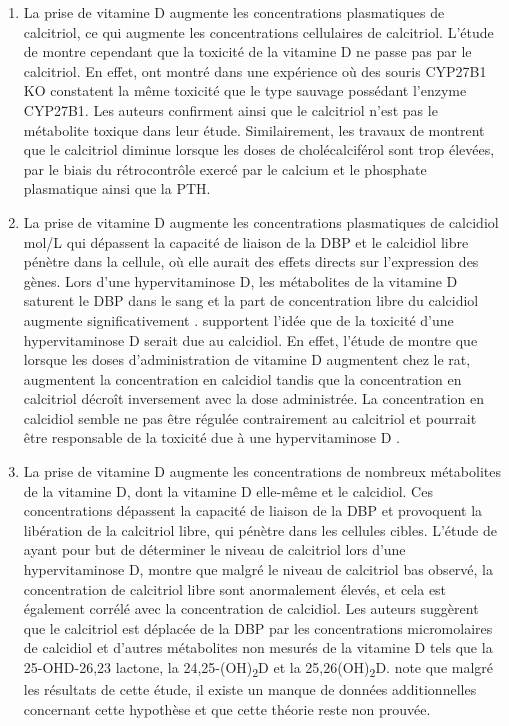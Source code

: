 \documentclass[
  a4paper,
  DIV=11,
  numbers=noendperiod,
  listof=totoc]{scrreprt}
\begin{document}
\begin{enumerate}
\def\labelenumi{\arabic{enumi}.}
\item
  La prise de vitamine D augmente les concentrations plasmatiques de
  calcitriol, ce qui augmente les concentrations cellulaires de
  calcitriol. L'étude de \textcite{DeLuca.2011} montre cependant que la
  toxicité de la vitamine D ne passe pas par le calcitriol. En effet,
  \textcite{DeLuca.2011} ont montré dans une expérience où des souris
  \ac{CYP27B1} KO constatent la même toxicité que le type sauvage
  possédant l'enzyme \ac{CYP27B1}. Les auteurs confirment ainsi que le
  calcitriol n'est pas le métabolite toxique dans leur étude.
  Similairement, les travaux de \textcite{Shepard.1980} montrent que le
  calcitriol diminue lorsque les doses de cholécalciférol sont trop
  élevées, par le biais du rétrocontrôle exercé par le calcium et le
  phosphate plasmatique ainsi que la \ac{PTH}.
\item
  La prise de vitamine D augmente les concentrations plasmatiques de
  calcidiol mol/L qui dépassent la capacité de liaison de la \ac{DBP} et
  le calcidiol libre pénètre dans la cellule, où elle aurait des effets
  directs sur l'expression des gènes. Lors d'une hypervitaminose D, les
  métabolites de la vitamine D saturent le DBP dans le sang et la part
  de concentration libre du calcidiol augmente significativement
  \autocite{Jones.2008}. \textcite{DeLuca.2011} supportent l'idée que de
  la toxicité d'une hypervitaminose D serait due au calcidiol. En effet,
  l'étude de \textcite{Shepard.1980} montre que lorsque les doses
  d'administration de vitamine D augmentent chez le rat, augmentent la
  concentration en calcidiol tandis que la concentration en calcitriol
  décroît inversement avec la dose administrée. La concentration en
  calcidiol semble ne pas être régulée contrairement au calcitriol et
  pourrait être responsable de la toxicité due à une hypervitaminose D
  \autocite{DeLuca.2011,Shepard.1980}.
\item
  La prise de vitamine D augmente les concentrations de nombreux
  métabolites de la vitamine D, dont la vitamine D elle-même et le
  calcidiol. Ces concentrations dépassent la capacité de liaison de la
  DBP et provoquent la libération de la calcitriol libre, qui pénètre
  dans les cellules cibles. L'étude de \textcite{Pettifor.1995} ayant
  pour but de déterminer le niveau de calcitriol lors d'une
  hypervitaminose D, montre que malgré le niveau de calcitriol bas
  observé, la concentration de calcitriol libre sont anormalement
  élevés, et cela est également corrélé avec la concentration de
  calcidiol. Les auteurs suggèrent que le calcitriol est déplacée de la
  \ac{DBP} par les concentrations micromolaires de calcidiol et d'autres
  métabolites non mesurés de la vitamine D tels que la 25-OHD-26,23
  lactone, la 24,25-(OH)\textsubscript{2}D et la
  25,26(OH)\textsubscript{2}D. \textcite{Jones.2008} note que malgré les
  résultats de cette étude, il existe un manque de données
  additionnelles concernant cette hypothèse et que cette théorie reste
  non prouvée.
\end{enumerate}
\end{document}
